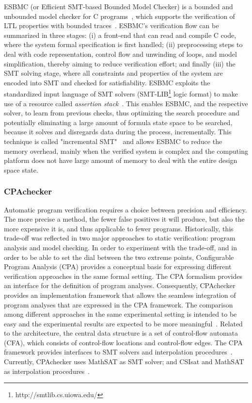ESBMC (or Efficient SMT-based Bounded Model Checker) is a bounded and unbounded model checker for C programs~\cite{esbmc2018}, which supports the verification of LTL properties with bounded traces~\cite{DBLP:journals/sosym/MorseCN015}. ESBMC's verification flow can be summarized in three stages: (i) a front-end that can read and compile C code, where the system formal specification is first handled; (ii) preprocessing steps to deal with code representation, control flow and unwinding of loops, and model simplification, thereby aiming to reduce verification effort; and finally (iii) the SMT solving stage, where all constraints and properties of the system are encoded into SMT and checked for satisfiability. ESBMC exploits the standardized input language of SMT solvers (SMT-LIB\footnote{http://smtlib.cs.uiowa.edu/} logic format) to make use of a resource called \textit{assertion stack}~\cite{Morse2015}. This enables ESBMC, and the respective solver, to learn from previous checks, thus optimizing the search procedure and potentially eliminating a large amount of formula state space to be searched, because it solves and disregards data during the process, incrementally. This technique is called "incremental SMT"~\cite{DBLP:journals/fac/SchrammelKBMTB17} and allows ESBMC to reduce the memory overhead, mainly when the verified system is complex and the computing platform does not have large amount of memory to deal with the entire design space state.

\subsubsection{CPAchecker}

Automatic program verification requires a choice between precision and efficiency. 
The more precise a method, the fewer false positives it will produce, but also the 
more expensive it is, and thus applicable to fewer programs. 
Historically, this trade-off was reflected in two major approaches to static verification: 
program analysis and model checking. In order to experiment with the trade-off, 
and in order to be able to set the dial between the two extreme points, 
Configurable Program Analysis (CPA) provides a conceptual basis for expressing 
different verification approaches in the same formal setting. The CPA formalism 
provides an interface for the definition of program analyses. Consequently, CPAchecker 
provides an implementation framework that allows the seamless integration of program 
analyses that are expressed in the CPA framework. The comparison among different 
approaches in the same experimental setting is intended to be easy and the experimental 
results are expected to be more meaningful~\cite{Beyer2011}. Related to the architecture, 
the central data structure is a set of control-flow automata (CFA), which consists of control-flow 
locations and control-flow edges. The CPA framework provides interfaces to SMT solvers and 
interpolation procedures~\cite{Beyer2011}. Currently, CPAchecker uses MathSAT as SMT solver; 
and CSIsat and MathSAT as interpolation procedures~\cite{Beyer2011}. 

